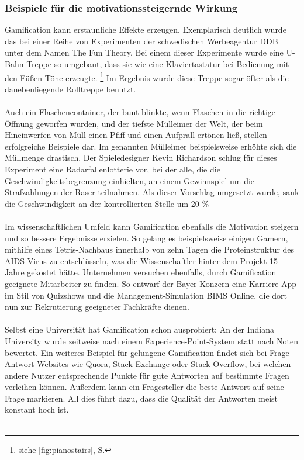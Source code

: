 \subsubsection{Beispiele für die motivationssteigernde Wirkung}
Gamification kann erstaunliche Effekte erzeugen. Exemplarisch deutlich wurde das bei einer Reihe von Experimenten der schwedischen Werbeagentur DDB unter dem Namen \glqq The Fun Theory\grqq . Bei einem dieser Experimente wurde eine U-Bahn-Treppe so umgebaut, dass sie wie eine Klaviertastatur bei Bedienung mit den Füßen Töne erzeugte. \footnote[4]{siehe \autoref{fig:pianostairs}, S. \pageref{fig:pianostairs}} Im Ergebnis wurde diese Treppe sogar öfter als die danebenliegende Rolltreppe benutzt. \cite{Src:PlanetWissen} \\ \\
Auch ein Flaschencontainer, der bunt blinkte, wenn Flaschen in die richtige Öffnung geworfen wurden, und der \glqq tiefste Mülleimer der Welt\grqq , der beim Hineinwerfen von Müll einen Pfiff und einen Aufprall ertönen ließ, stellen erfolgreiche Beispiele dar. Im genannten Mülleimer beispielsweise erhöhte sich die Müllmenge drastisch. \cite{Src:PlanetWissen} Der Spieledesigner Kevin Richardson schlug für dieses Experiment eine Radarfallenlotterie vor, bei der alle, die die Geschwindigkeitsbegrenzung einhielten, an einem Gewinnspiel um die Strafzahlungen der Raser teilnahmen. Als dieser Vorschlag umgesetzt wurde, sank die Geschwindigkeit an der kontrollierten Stelle um 20 \% \cite{Src:GamifDesign} \\ \\
Im wissenschaftlichen Umfeld kann Gamification ebenfalls die Motivation steigern und so bessere Ergebnisse erzielen. So gelang es beispielsweise einigen Gamern, mithilfe eines Tetris-Nachbaus innerhalb von zehn Tagen die Proteinstruktur des AIDS-Virus zu entschlüsseln, was die Wissenschaftler hinter dem Projekt 15 Jahre gekostet hätte. \cite{Src:DLFMotiv} Unternehmen versuchen ebenfalls, durch Gamification geeignete Mitarbeiter zu finden. So entwarf der Bayer-Konzern eine Karriere-App im Stil von Quizshows und die Management-Simulation \glqq BIMS Online\grqq , die dort nun zur Rekrutierung geeigneter Fachkräfte dienen. \\ \\
Selbst eine Universität hat Gamification schon ausprobiert: An der Indiana University wurde zeitweise nach einem Experience-Point-System statt nach Noten bewertet. \cite{Src:XPNoten} Ein weiteres Beispiel für gelungene Gamification findet sich bei Frage-Antwort-Websites wie Quora, Stack Exchange oder Stack Overflow, bei welchen andere Nutzer entsprechende Punkte für gute Antworten auf bestimmte Fragen verleihen können. Außerdem kann ein Fragesteller die beste Antwort auf seine Frage markieren. All dies führt dazu, dass die Qualität der Antworten meist konstant hoch ist. \cite{Src:GamifDesign} \\ \\
